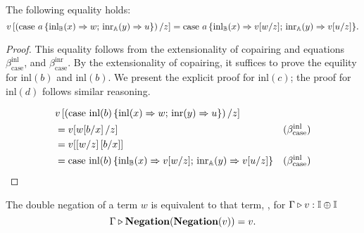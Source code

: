 


\begin{proposition} 
  The following equality holds:
  \begin{equation*}
   v \left[ \left(\text{case } a \,\{\mathrm{inl}_{\mathbb{B}}(x) \Rightarrow w ; \, \mathrm{inr}_{\mathbb{A}}(y) \Rightarrow u\}\right)  / z \right]  =  \text{case } a \,\{\mathrm{inl}_{\mathbb{B}}(x) \Rightarrow v[w/z] ; \, \mathrm{inr}_{\mathbb{A}}(y) \Rightarrow v[u/z]\}.
  \end{equation*}
\end{proposition}

  \begin{proof}
    
This equality follows from the extensionality of copairing and equations  $\beta_{\text{case}}^{\text{inl}}$, and $\beta_{\text{case}}^{\text{inr}}$. 
By the extensionality of copairing, it suffices to prove the equility for  $\text{inl}(b)$ and $\text{inl}(b)$.
We present the explicit proof for $\text{inl}(c)$; the proof for  $\text{inl}(d)$ follows similar reasoning.

\begin{equation*}
\begin{split}
  & v \left[ \left(\text{case } \text{inl}(b) \,\{\mathrm{inl}(x) \Rightarrow w ; \, \mathrm{inr}(y) \Rightarrow u\}\right)  / z \right] & \\
  & =  v [w[b/x]\,/z] & (\beta_{\text{case}}^{\text{inl}})\\
  & =   v [[w/z]\,[b/x]]    \\
   & =  \text{case } \text{inl}(b) \,\{\mathrm{inl}_{\mathbb{B}}(x) \Rightarrow v[w/z] ; \, \mathrm{inr}_{\mathbb{A}}(y) \Rightarrow v[u/z]\}   & (\beta_{\text{case}}^{\text{inl}})
\end{split}
\end{equation*}
  \end{proof}


\begin{lemma} \label{lem:dneg}
  The double negation of a term $w$ is equivalent to that term, \ie, for $ \Gamma \triangleright v: \mathbb{I} \oplus \mathbb{I}$
  $$ \Gamma \triangleright \textbf{Negation} (\textbf{Negation} (v) ) = v.$$
\end{lemma}


